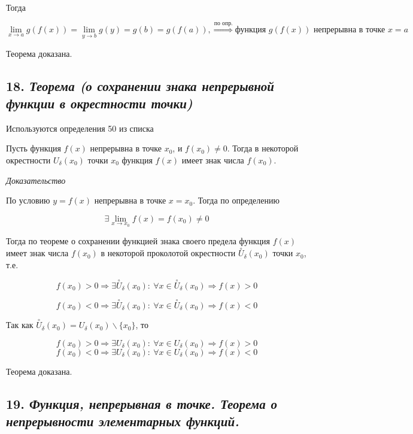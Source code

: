 Тогда

$$
\lim\limits_{x \to a}g(f(x)) = \lim\limits_{y \to b}g(y) = g(b) = g(f(a)), \overset{\text{по опр.}}\Rightarrow \text{функция } g(f(x)) \text{ непрерывна в точке } x = a
$$

Теорема доказана.
\newpage 
\subsection*{18. \textit{Теорема (о сохранении знака непрерывной функции в окрестности точки)}}
\begin{Quote2} 
\small\centering 

Используются определения 50 из списка \end{Quote2} 

Пусть функция $f(x)$ непрерывна в точке $x_0$, и $f(x_0) \neq 0$. Тогда в некоторой окрестности $U_\delta(x_0)$ точки $x_0$ функция $f(x)$ имеет знак числа $f(x_0)$.
\vspace*{20pt} 

\textit{Доказательство}

По условию $y = f(x)$ непрерывна в точке $x = x_0$. Тогда по определению

$$
\exists\lim\limits_{x \to x_0}f(x) = f(x_0) \neq 0
$$

Тогда по теореме о сохранении функцией знака своего предела функция $f(x)$ имеет знак числа $f(x_0)$ в некоторой проколотой окрестности $\overset{\circ}U_\delta(x_0)$ точки $x_0$, т.е.

$$
f(x_0) > 0 \Rightarrow \exists \overset{\circ}U_\delta(x_0):\ \forall x \in \overset{\circ}U_\delta(x_0)\Rightarrow f(x) > 0 
$$

$$
f(x_0) < 0 \Rightarrow \exists \overset{\circ}U_\delta(x_0):\ \forall x \in \overset{\circ}U_\delta(x_0)\Rightarrow f(x) < 0 
$$

Так как $\overset{\circ}U_\delta(x_0) = U_\delta(x_0) \backslash \{x_0\}$, то

$$
f(x_0) > 0 \Rightarrow \exists U_\delta(x_0):\ \forall x \in U_\delta(x_0)\Rightarrow f(x) > 0 
$$ $$
f(x_0) < 0 \Rightarrow \exists U_\delta(x_0):\ \forall x \in U_\delta(x_0)\Rightarrow f(x) < 0 
$$

Теорема доказана.
\newpage 
\subsection*{19. \textit{Функция, непрерывная в точке. Теорема о непрерывности элементарных функций.}}

